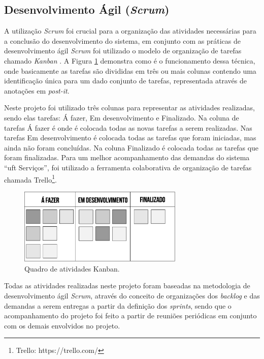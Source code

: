 \subsection*{Desenvolvimento Ágil (\textit{Scrum})}

\noindent A utilização \textit{Scrum} foi crucial para a organização das atividades necessárias para a conclusão do desenvolvimento do sistema, em conjunto com as práticas de desenvolvimento ágil \textit{Scrum} foi utilizado o modelo de organização de tarefas chamado \textit{Kanban} \cite{anderson2010kanban}. A Figura \ref{quadro-kanban} demonstra como é o funcionamento dessa técnica, onde basicamente as tarefas são divididas em três ou mais colunas contendo uma identificação única para um dado conjunto de tarefas, representada através de anotações em \textit{post-it}.

Neste projeto foi utilizado três colunas para representar as atividades realizadas, sendo elas tarefas: Á fazer, Em desenvolvimento e Finalizado. Na coluna de tarefas Á fazer é onde é colocada todas as novas tarefas a serem realizadas. Nas tarefas Em desenvolvimento é colocada todas as tarefas que foram iniciadas, mas ainda não foram concluídas. Na coluna Finalizado é colocada todas as tarefas que foram finalizadas. Para um melhor acompanhamento das demandas do sistema ``\acrshort{uft} Serviços'', foi utilizado a ferramenta colaborativa de organização de tarefas chamada Trello\footnote{Trello: https://trello.com/}.

\begin{figure}[H]
 \centering
 \includegraphics[width=0.7\textwidth]{figuras/kanban.eps} 
 \caption{Quadro de atividades Kanban.}
 \label{quadro-kanban} 
\end{figure}

Todas as atividades realizadas neste projeto foram baseadas na metodologia de desenvolvimento ágil \textit{Scrum}, através do conceito de organizações dos \textit{backlog} e das demandas a serem entregas a partir da definição dos \textit{sprints}, sendo que o acompanhamento do projeto foi feito a partir de reuniões periódicas em conjunto com os demais envolvidos no projeto.

